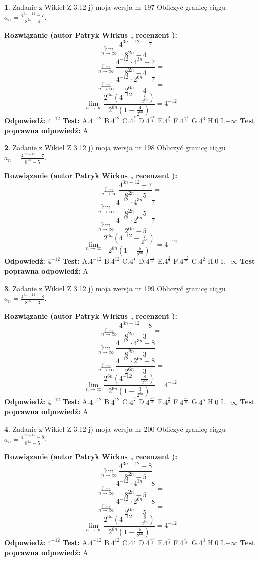 \documentclass[12pt, a4paper]{article}
\theoremstyle{definition} %
\newtheorem{zad}{}
\newcommand{\zadStart}[1]{\begin{zad}#1\newline}
\newcommand{\zadStop}{\end{zad}}
\newcommand{\rozwStart}[2]{\noindent \textbf{Rozwiązanie (autor #1 , recenzent #2): }\newline}
\newcommand{\rozwStop}{\newline}
\newcommand{\odpStart}{\noindent \textbf{Odpowiedź:}\newline}
\newcommand{\odpStop}{\newline}
\newcommand{\testStart}{\noindent \textbf{Test:}\newline}
\newcommand{\testStop}{\newline}
\newcommand{\kluczStart}{\noindent \textbf{Test poprawna odpowiedź:}\newline}
\newcommand{\kluczStop}{\newline}
\begin{document}
\zadStart{Zadanie z Wikieł Z 3.12 j) moja wersja nr 197}
Obliczyć granicę ciągu $a_{n}=\frac{4^{3n-12}-7}{8^{2n}-4}$.
\zadStop
\rozwStart{Patryk Wirkus}{}
$$\lim\limits_{n\to\infty}\frac{4^{3n-12}-7}{8^{2n}-4}=$$
$$\lim\limits_{n\to\infty}\frac{4^{-12} \cdot 4^{3n}-7}{8^{2n}-4}=$$
$$\lim\limits_{n\to\infty}\frac{4^{-12} \cdot 2^{6n}-7}{2^{6n}-4}=$$
$$\lim\limits_{n\to\infty}\frac{2^{6n}(4^{-12} - \frac{7}{2^{6n}})}{2^{6n}(1-\frac{4}{2^{6n}})}= 4^{-12}$$
\rozwStop
\odpStart
$4^{-12}$
\odpStop
\testStart
A.$4^{-12}$
B.$4^{12}$
C.$4^{\frac{7}{4}}$
D.$4^{\frac{-7}{4}}$
E.$4^{\frac{4}{7}}$
F.$4^{\frac{-4}{7}}$
G.$4^{3}$
H.$0$
I.$-\infty$
\testStop
\kluczStart
A
\kluczStop



\zadStart{Zadanie z Wikieł Z 3.12 j) moja wersja nr 198}
Obliczyć granicę ciągu $a_{n}=\frac{4^{3n-12}-7}{8^{2n}-5}$.
\zadStop
\rozwStart{Patryk Wirkus}{}
$$\lim\limits_{n\to\infty}\frac{4^{3n-12}-7}{8^{2n}-5}=$$
$$\lim\limits_{n\to\infty}\frac{4^{-12} \cdot 4^{3n}-7}{8^{2n}-5}=$$
$$\lim\limits_{n\to\infty}\frac{4^{-12} \cdot 2^{6n}-7}{2^{6n}-5}=$$
$$\lim\limits_{n\to\infty}\frac{2^{6n}(4^{-12} - \frac{7}{2^{6n}})}{2^{6n}(1-\frac{5}{2^{6n}})}= 4^{-12}$$
\rozwStop
\odpStart
$4^{-12}$
\odpStop
\testStart
A.$4^{-12}$
B.$4^{12}$
C.$4^{\frac{7}{5}}$
D.$4^{\frac{-7}{5}}$
E.$4^{\frac{5}{7}}$
F.$4^{\frac{-5}{7}}$
G.$4^{2}$
H.$0$
I.$-\infty$
\testStop
\kluczStart
A
\kluczStop



\zadStart{Zadanie z Wikieł Z 3.12 j) moja wersja nr 199}
Obliczyć granicę ciągu $a_{n}=\frac{4^{3n-12}-8}{8^{2n}-3}$.
\zadStop
\rozwStart{Patryk Wirkus}{}
$$\lim\limits_{n\to\infty}\frac{4^{3n-12}-8}{8^{2n}-3}=$$
$$\lim\limits_{n\to\infty}\frac{4^{-12} \cdot 4^{3n}-8}{8^{2n}-3}=$$
$$\lim\limits_{n\to\infty}\frac{4^{-12} \cdot 2^{6n}-8}{2^{6n}-3}=$$
$$\lim\limits_{n\to\infty}\frac{2^{6n}(4^{-12} - \frac{8}{2^{6n}})}{2^{6n}(1-\frac{3}{2^{6n}})}= 4^{-12}$$
\rozwStop
\odpStart
$4^{-12}$
\odpStop
\testStart
A.$4^{-12}$
B.$4^{12}$
C.$4^{\frac{8}{3}}$
D.$4^{\frac{-8}{3}}$
E.$4^{\frac{3}{8}}$
F.$4^{\frac{-3}{8}}$
G.$4^{5}$
H.$0$
I.$-\infty$
\testStop
\kluczStart
A
\kluczStop



\zadStart{Zadanie z Wikieł Z 3.12 j) moja wersja nr 200}
Obliczyć granicę ciągu $a_{n}=\frac{4^{3n-12}-8}{8^{2n}-5}$.
\zadStop
\rozwStart{Patryk Wirkus}{}
$$\lim\limits_{n\to\infty}\frac{4^{3n-12}-8}{8^{2n}-5}=$$
$$\lim\limits_{n\to\infty}\frac{4^{-12} \cdot 4^{3n}-8}{8^{2n}-5}=$$
$$\lim\limits_{n\to\infty}\frac{4^{-12} \cdot 2^{6n}-8}{2^{6n}-5}=$$
$$\lim\limits_{n\to\infty}\frac{2^{6n}(4^{-12} - \frac{8}{2^{6n}})}{2^{6n}(1-\frac{5}{2^{6n}})}= 4^{-12}$$
\rozwStop
\odpStart
$4^{-12}$
\odpStop
\testStart
A.$4^{-12}$
B.$4^{12}$
C.$4^{\frac{8}{5}}$
D.$4^{\frac{-8}{5}}$
E.$4^{\frac{5}{8}}$
F.$4^{\frac{-5}{8}}$
G.$4^{3}$
H.$0$
I.$-\infty$
\testStop
\kluczStart
A
\kluczStop
\end{document}
